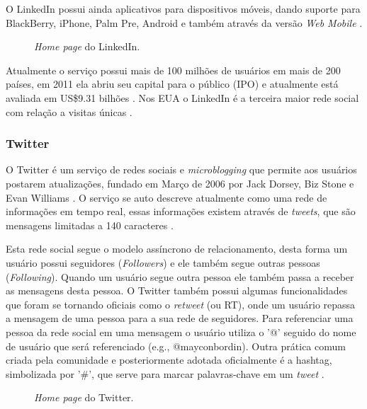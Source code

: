 \documentclass[diss]{template/setrem}
\begin{document}
O LinkedIn possui ainda aplicativos para dispositivos móveis, dando suporte para BlackBerry, iPhone, Palm Pre, Android e também através da versão \emph{Web Mobile} \citep{LinkedIn2012b}.

\begin{figure}[!h]
    \caption{\emph{Home page} do LinkedIn.}
    \label{fig:linkedin-home}
\end{figure}

Atualmente o serviço possui mais de 100 milhões de usuários em mais de 200 países, em 2011 ela abriu seu capital para o público (IPO) e atualmente está avaliada em US\$9.31 bilhões \citep{CrunchBase2012a}. Nos EUA o LinkedIn é a terceira maior rede social com relação a visitas únicas \citep{Lipsman2011}.

\subsubsection{Twitter}
O Twitter é um serviço de redes sociais e \emph{microblogging} que permite aos usuários postarem atualizações, fundado em Março de 2006 por Jack Dorsey, Biz Stone e Evan Williams \citep{CrunchBase2012b}. O serviço se auto descreve atualmente como uma rede de informações em tempo real, essas informações existem através de \emph{tweets}, que são mensagens limitadas a 140 caracteres \citep{Twitter2012}.

Esta rede social segue o modelo assíncrono de relacionamento, desta forma um usuário possui seguidores (\emph{Followers}) e ele também segue outras pessoas (\emph{Following}). Quando um usuário segue outra pessoa ele também passa a receber as mensagens desta pessoa. O Twitter também possui algumas funcionalidades que foram se tornando oficiais como o \emph{retweet} (ou RT), onde um usuário repassa a mensagem de uma pessoa para a sua rede de seguidores. Para referenciar uma pessoa da rede social em uma mensagem o usuário utiliza o '@' seguido do nome de usuário que será referenciado (e.g., @mayconbordin). Outra prática comum criada pela comunidade e posteriormente adotada oficialmente é a hashtag, simbolizada por '\#', que serve para marcar palavras-chave em um \emph{tweet} \citep{Kwak2010, Twitter2012a}.

\begin{figure}[!h]
    \caption{\emph{Home page} do Twitter.}
    \label{fig:twitter-home}
\end{figure}
\end{document}
